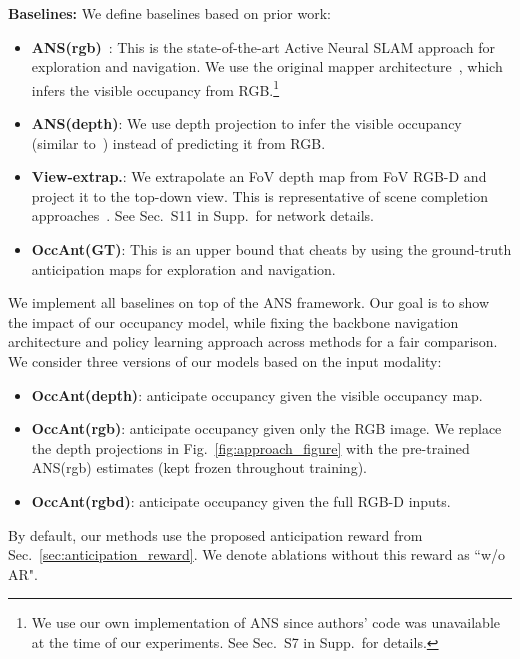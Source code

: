 \documentclass[runningheads]{llncs}
\begin{document}
\noindent\textbf{Baselines:} We define baselines based on prior work:
\begin{itemize}
    \item \textbf{ANS(rgb)}~\cite{chaplot2020learning}: This is the state-of-the-art Active Neural SLAM approach for exploration and navigation. We use the original mapper architecture~\cite{chaplot2020learning}, which infers the visible occupancy from RGB.\footnote{We use our own implementation of ANS since authors' code was unavailable at the time of our experiments. See Sec.~S7 in Supp.~for details.}
    \item \textbf{ANS(depth)}: We use depth projection to infer the visible occupancy (similar to~\cite{chen2019learning}) instead of predicting it from RGB.
    \item \textbf{View-extrap.}: We extrapolate an  FoV depth map from  FoV RGB-D and project it to the top-down view.  This is representative of scene completion approaches~\cite{song2018im2pano3d,Yang_2019_CVPR}. See Sec.~S11 in Supp.~for network details.
    \item \textbf{OccAnt(GT)}: This is an upper bound that cheats by using the ground-truth anticipation maps for exploration and navigation.
\end{itemize}

We implement all baselines on top of the ANS framework. Our goal is to show the impact of our occupancy model, while fixing the backbone navigation architecture and policy learning approach across methods for a fair comparison. We consider three versions of our models based on the input modality:

\begin{itemize}
    \item \textbf{OccAnt(depth)}: anticipate occupancy given the visible occupancy map. 
    \item \textbf{OccAnt(rgb)}: anticipate occupancy given only the RGB image. We replace the depth projections in Fig.~\ref{fig:approach_figure} with the pre-trained ANS(rgb) estimates (kept frozen throughout training).
    \item \textbf{OccAnt(rgbd)}: anticipate occupancy given the full RGB-D inputs.
\end{itemize}
By default, our methods use the proposed anticipation reward from Sec.~\ref{sec:anticipation_reward}. We denote ablations without this reward as ``w/o AR". \\
\end{document}
